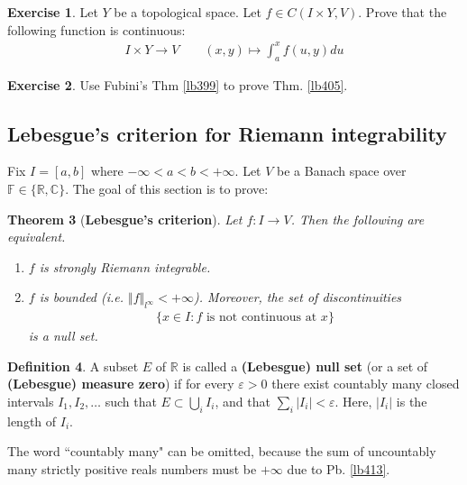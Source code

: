 \documentclass[12pt,b5paper,notitlepage]{article}
\theoremstyle{definition}
\newtheorem{df}{Definition}[section]
\newtheorem{exe}[df]{Exercise}
\theoremstyle{plain}
\newtheorem{thm}[df]{Theorem}
\newcommand{\Cbb}{\mathbb C}
\newcommand{\Rbb}{\mathbb R}
\newcommand{\Fbb}{\mathbb F}
\newcommand{\eps}{\varepsilon}
\numberwithin{equation}{section}
\begin{document}
\begin{exe}\label{lb408}
Let $Y$ be a topological space. Let $f\in C(I\times Y,V)$. Prove that the following function is continuous:
\begin{gather}
I\times Y\rightarrow V\qquad (x,y)\mapsto\int_a^x f(u,y)du
\end{gather}
\end{exe}



\begin{exe}
Use Fubini's Thm \ref{lb399} to prove Thm. \ref{lb405}.
\end{exe}




\subsection{Lebesgue's criterion for Riemann integrability}


Fix $I=[a,b]$ where $-\infty<a<b<+\infty$. Let $V$ be a Banach space over $\Fbb\in\{\Rbb,\Cbb\}$. The goal of this section is to prove:


\begin{thm}[\textbf{Lebesgue's criterion}]   \label{lb411}
Let $f:I\rightarrow V$. Then the following are equivalent.
\begin{enumerate}[label=(\arabic*)]
\item $f$ is strongly Riemann integrable.
\item $f$ is bounded (i.e. $\Vert f\Vert_{l^\infty}<+\infty$). Moreover, the set of discontinuities
\begin{align}
\{x\in I:f\text{ is not continuous at }x\}
\end{align}
is a null set.
\end{enumerate}
\end{thm}


\begin{df}\label{lb409}
A subset $E$ of $\Rbb$ is called a  \textbf{(Lebesgue) null set}  (or a set of \textbf{(Lebesgue) measure zero}) if for every $\eps>0$ there exist countably many closed intervals $I_1,I_2,\dots$ such that $E\subset\bigcup_i I_i$, and that $\sum_i |I_i|<\eps$. Here, $|I_i|$ is the length of $I_i$.
\end{df}

The word ``countably many" can be omitted, because the sum of uncountably many strictly positive reals numbers must be $+\infty$ due to Pb. \ref{lb413}.
\end{document}
